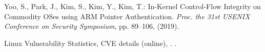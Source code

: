 \documentclass[english,sigrecommended,JIP]{ipsj}
\begin{document}
\begin{thebibliography}{99}
  Yoo, S., Park, J., Kim, S., Kim, Y., Kim, T.: In-Kernel Control-Flow Integrity on Commodity OSes using ARM Pointer Authentication.
  \textit{Proc. the 31st USENIX Conference on Security Symposium}, pp. 89--106, (2019). 

  Linux Vulnerability Statistics, CVE details (online), . .

  
\end{thebibliography}



\end{document}
